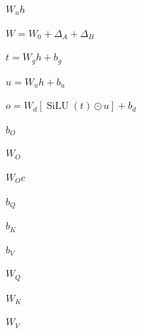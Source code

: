 \documentclass{article}
\begin{document}
\begin{preview}
{\fontsize{18}{21.599999999999998}\selectfont\color[HTML]{222222}$\displaystyle W_{u}h$}
\end{preview}
\begin{preview}
{\fontsize{22}{26.4}\selectfont\color[HTML]{222222}$\displaystyle W = W_{0} + \Delta _{A} + \Delta _{B}$}
\end{preview}
\begin{preview}
{\fontsize{21}{25.2}\selectfont\color[HTML]{222222}$\displaystyle t = W_{g}h + b_{g}$}
\end{preview}
\begin{preview}
{\fontsize{21}{25.2}\selectfont\color[HTML]{222222}$\displaystyle u = W_{u}h + b_{u}$}
\end{preview}
\begin{preview}
{\fontsize{21}{25.2}\selectfont\color[HTML]{222222}$\displaystyle o = W_{d}[\operatorname{SiLU}(t) \odot  u] + b_{d}$}
\end{preview}
\begin{preview}
{\fontsize{24}{28.799999999999997}\selectfont\color[HTML]{222222}$\displaystyle b_{O}$}
\end{preview}
\begin{preview}
{\fontsize{22}{26.4}\selectfont\color[HTML]{222222}$\displaystyle W_{O}$}
\end{preview}
\begin{preview}
{\fontsize{18}{21.599999999999998}\selectfont\color[HTML]{222222}$\displaystyle W_{O}c$}
\end{preview}
\begin{preview}
{\fontsize{24}{28.799999999999997}\selectfont\color[HTML]{222222}$\displaystyle b_{Q}$}
\end{preview}
\begin{preview}
{\fontsize{24}{28.799999999999997}\selectfont\color[HTML]{222222}$\displaystyle b_{K}$}
\end{preview}
\begin{preview}
{\fontsize{24}{28.799999999999997}\selectfont\color[HTML]{222222}$\displaystyle b_{V}$}
\end{preview}
\begin{preview}
{\fontsize{22}{26.4}\selectfont\color[HTML]{222222}$\displaystyle W_{Q}$}
\end{preview}
\begin{preview}
{\fontsize{22}{26.4}\selectfont\color[HTML]{222222}$\displaystyle W_{K}$}
\end{preview}
\begin{preview}
{\fontsize{22}{26.4}\selectfont\color[HTML]{222222}$\displaystyle W_{V}$}
\end{preview}
\end{document}
